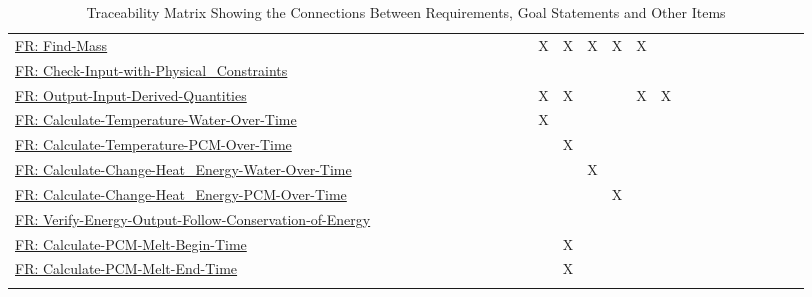 \documentclass[12pt]{article}
\begin{document}
\begin{longtable}{l l l l l l l l l l l l l l l l l l l l l l l l l l l}
\\
\hyperref[findMass]{FR: Find-Mass} &  &  &  &  &  &  &  &  &  &  &  & X & X & X & X & X &  &  &  &  &  &  &  &  &  & 
\\
\hyperref[checkWithPhysConsts]{FR: Check-Input-with-Physical\_Constraints} &  &  &  &  &  &  &  &  &  &  &  &  &  &  &  &  &  &  &  &  &  &  &  &  &  & 
\\
\hyperref[outputInputDerivQuants]{FR: Output-Input-Derived-Quantities} &  &  &  &  &  &  &  &  &  &  &  & X & X &  &  & X & X &  &  &  &  &  &  &  &  & 
\\
\hyperref[calcTempWtrOverTime]{FR: Calculate-Temperature-Water-Over-Time} &  &  &  &  &  &  &  &  &  &  &  & X &  &  &  &  &  &  &  &  &  &  &  &  &  & 
\\
\hyperref[calcTempPCMOverTime]{FR: Calculate-Temperature-PCM-Over-Time} &  &  &  &  &  &  &  &  &  &  &  &  & X &  &  &  &  &  &  &  &  &  &  &  &  & 
\\
\hyperref[calcChgHeatEnergyWtrOverTime]{FR: Calculate-Change-Heat\_Energy-Water-Over-Time} &  &  &  &  &  &  &  &  &  &  &  &  &  & X &  &  &  &  &  &  &  &  &  &  &  & 
\\
\hyperref[calcChgHeatEnergyPCMOverTime]{FR: Calculate-Change-Heat\_Energy-PCM-Over-Time} &  &  &  &  &  &  &  &  &  &  &  &  &  &  & X &  &  &  &  &  &  &  &  &  &  & 
\\
\hyperref[verifyEnergyOutput]{FR: Verify-Energy-Output-Follow-Conservation-of-Energy} &  &  &  &  &  &  &  &  &  &  &  &  &  &  &  &  &  &  &  &  &  &  &  &  &  & 
\\
\hyperref[calcPCMMeltBegin]{FR: Calculate-PCM-Melt-Begin-Time} &  &  &  &  &  &  &  &  &  &  &  &  & X &  &  &  &  &  &  &  &  &  &  &  &  & 
\\
\hyperref[calcPCMMeltEnd]{FR: Calculate-PCM-Melt-End-Time} &  &  &  &  &  &  &  &  &  &  &  &  & X &  &  &  &  &  &  &  &  &  &  &  &  & 
\\
\bottomrule
\caption{Traceability Matrix Showing the Connections Between Requirements, Goal Statements and Other Items}
\label{Table:TraceMatAllvsR}
\end{longtable}
\end{document}
